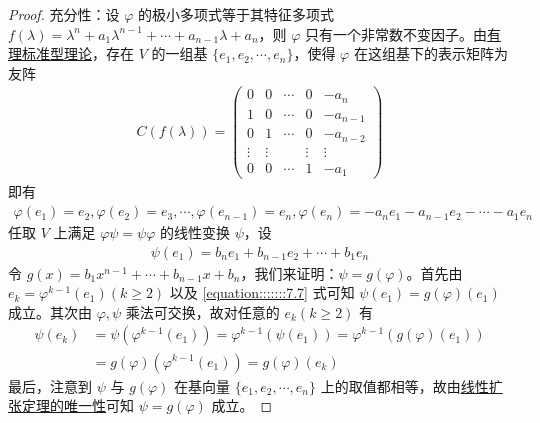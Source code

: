 \documentclass[../../main.tex]{subfiles}
\begin{document}
\begin{proof}
{\heiti 充分性：}设 $\varphi$ 的极小多项式等于其特征多项式 $f(\lambda)=\lambda^n + a_1\lambda^{n - 1}+\cdots + a_{n - 1}\lambda + a_n$，则 $\varphi$ 只有一个非常数不变因子。由\hyperref[theorem:有理标准型核心定理]{有理标准型理论}，存在 $V$ 的一组基 $\{e_1,e_2,\cdots,e_n\}$，使得 $\varphi$ 在这组基下的表示矩阵为友阵
\begin{align*}
C(f(\lambda))=\begin{pmatrix}
0 & 0 & \cdots & 0 & -a_n \\
1 & 0 & \cdots & 0 & -a_{n - 1} \\
0 & 1 & \cdots & 0 & -a_{n - 2} \\
\vdots & \vdots & & \vdots & \vdots \\
0 & 0 & \cdots & 1 & -a_1
\end{pmatrix}
\end{align*}
即有
\begin{align*}
\varphi(e_1)=e_2,\varphi(e_2)=e_3,\cdots,\varphi(e_{n - 1})=e_n,\varphi(e_n)=-a_ne_1 - a_{n - 1}e_2 - \cdots - a_1e_n
\end{align*}
任取 $V$ 上满足 $\varphi\psi = \psi\varphi$ 的线性变换 $\psi$，设
\begin{align}
\psi(e_1)=b_ne_1 + b_{n - 1}e_2 + \cdots + b_1e_n\label{equation:::::::7.7}
\end{align}
令 $g(x)=b_1x^{n - 1}+\cdots + b_{n - 1}x + b_n$，我们来证明：$\psi = g(\varphi)$。首先由 $e_k=\varphi^{k - 1}(e_1)(k\geqslant  2)$ 以及 \eqref{equation:::::::7.7} 式可知 $\psi(e_1)=g(\varphi)(e_1)$ 成立。其次由 $\varphi,\psi$ 乘法可交换，故对任意的 $e_k(k\geqslant  2)$ 有
\begin{align*}
\psi(e_k)&=\psi(\varphi^{k - 1}(e_1))=\varphi^{k - 1}(\psi(e_1))=\varphi^{k - 1}(g(\varphi)(e_1))\\
&=g(\varphi)(\varphi^{k - 1}(e_1))=g(\varphi)(e_k)
\end{align*}
最后，注意到 $\psi$ 与 $g(\varphi)$ 在基向量 $\{e_1,e_2,\cdots,e_n\}$ 上的取值都相等，故由\hyperref[theorem:线性扩张定理]{线性扩张定理的唯一性}可知 $\psi = g(\varphi)$ 成立。


\end{proof}
\end{document}
